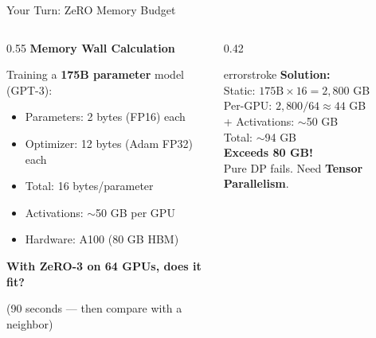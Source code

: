 \documentclass[aspectratio=169, 12pt]{beamer}
\begin{document}
\begin{frame}{Your Turn: ZeRO Memory Budget}

\footnotesize
\begin{columns}[T]
  \begin{column}{0.55\textwidth}
    {\normalsize\bfseries Memory Wall Calculation}

    \vspace{0.15cm}
    Training a \textbf{175B parameter} model (GPT-3):
    \begin{itemize}\setlength\itemsep{0pt}
      \item Parameters: 2 bytes (FP16) each
      \item Optimizer: 12 bytes (Adam FP32) each
      \item Total: 16 bytes/parameter
      \item Activations: $\sim$50 GB per GPU
      \item Hardware: A100 (80 GB HBM)
    \end{itemize}

    \vspace{0.1cm}
    \textbf{With ZeRO-3 on 64 GPUs, does it fit?}

    {\scriptsize\textcolor{midgray}{(90 seconds --- then compare with a neighbor)}}
  \end{column}
  \begin{column}{0.42\textwidth}
    \pause
    \begin{mlsyscard}{errorstroke}
    \textbf{Solution:}\\[0.05cm]
    {\scriptsize
    Static: $175\text{B} \times 16 = 2{,}800$ GB\\
    Per-GPU: $2{,}800 / 64 \approx 44$ GB\\
    + Activations: $\sim$50 GB\\
    Total: $\sim$94 GB\\[0.05cm]
    \textcolor{errorstroke}{\textbf{Exceeds 80 GB!}}\\
    Pure DP fails. Need \textbf{Tensor Parallelism}.
    }
    \end{mlsyscard}
  \end{column}
\end{columns}

\end{frame}
\end{document}
